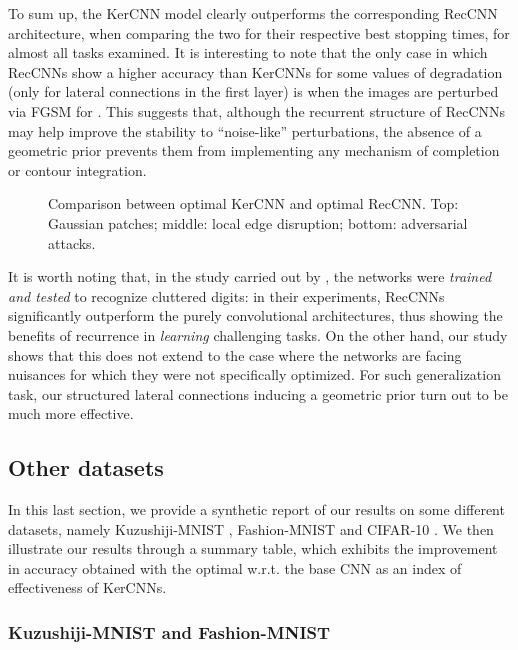 \documentclass[11pt,oneside,reqno]{amsart}
\begin{document}
 To sum up, the KerCNN model clearly outperforms the corresponding RecCNN architecture, when comparing the two for their respective best stopping times, for almost all tasks examined. It is interesting to note that the only case in which RecCNNs show a higher accuracy than KerCNNs for some values of degradation (only for lateral connections in the first layer) is when the images are perturbed via FGSM for . This suggests that, although the recurrent structure of RecCNNs may help improve the stability to ``noise-like'' perturbations, the absence of a geometric prior prevents them from implementing any mechanism of completion or contour integration. 
 \begin{figure}[htbp!]
  \centering
 \quad
 \caption{Comparison between optimal KerCNN and optimal RecCNN. Top: Gaussian patches; middle: local edge disruption; bottom: adversarial attacks.
}\label{rk}
 \end{figure}
 It is worth noting that, in the study carried out by \citet{spoerer}, the networks were \emph{trained and tested} to recognize cluttered digits: in their experiments, RecCNNs significantly outperform the purely convolutional architectures, thus showing the benefits of recurrence in \emph{learning} challenging tasks. On the other hand, our study shows that this does not extend to the case where the networks are facing nuisances for which they were not specifically optimized. For such generalization task, our structured lateral connections inducing a geometric prior turn out to be much more effective.
 
 \subsection{Other datasets}
 
 In this last section, we provide a synthetic report of our results on some different datasets, namely Kuzushiji-MNIST \citep{kmnist}, Fashion-MNIST \citep{fashion} and CIFAR-10 \citep{cifar}. We then illustrate our results through a summary table, which exhibits the improvement in accuracy obtained with the optimal  w.r.t. the base CNN as an index of effectiveness of KerCNNs.
 
 \subsubsection{Kuzushiji-MNIST and Fashion-MNIST}
 
\end{document}
